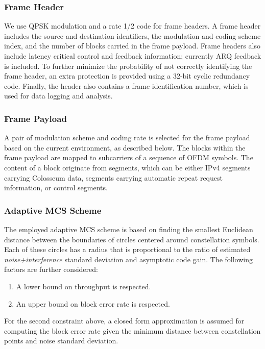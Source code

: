 \documentclass[11pt]{article}
\begin{document}
\subsubsection{Frame Header}
We use QPSK modulation and a rate 1/2 code for frame headers. A frame header includes the source and destination identifiers, the modulation and coding scheme index, and the number of blocks carried in the frame payload.  Frame headers also include latency critical control and feedback information; currently ARQ feedback is included. To further minimize the probability of not correctly identifying the frame header, an extra protection is provided using a 32-bit cyclic redundancy code. Finally, the header also contains a frame identification number, which is used for data logging and analysis.

\subsubsection{Frame Payload}
A pair of modulation scheme and coding rate is selected for the frame payload based on the current environment, as described below. The blocks within the frame payload are mapped to subcarriers of a sequence of OFDM symbols. The content of a block originate from segments, which can be either IPv4 segments carrying Colosseum data,  segments carrying automatic repeat request information, or control segments.

\subsubsection{Adaptive MCS Scheme}
The employed adaptive MCS scheme is based on finding the smallest Euclidean distance between the boundaries of circles centered around constellation symbols. Each of these circles has a radius that is proportional to the ratio of estimated \emph{noise+interference} standard deviation and asymptotic code gain. The following factors are further considered:
\begin{enumerate}
    \item A lower bound on throughput is respected.
    \item An upper bound on block error rate is respected.
\end{enumerate}
For the second constraint above, a closed form approximation is assumed for computing the block error rate given the minimum distance between constellation points and noise standard deviation. 
\end{document}
